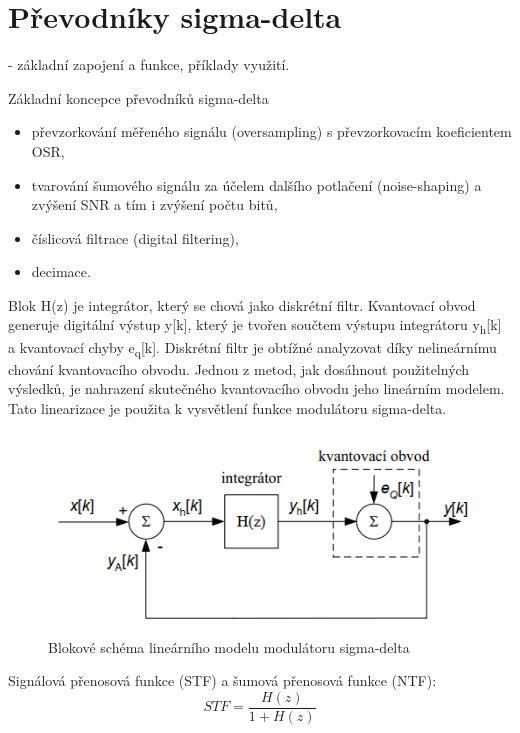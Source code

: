 \section{Převodníky sigma-delta}
- základní zapojení a funkce, příklady využití.

Základní koncepce převodníků sigma-delta
\begin{itemize}
\item převzorkování měřeného signálu (oversampling) s převzorkovacím koeficientem OSR,
\item tvarování šumového signálu za účelem dalšího potlačení (noise-shaping) a zvýšení SNR a tím i zvýšení počtu bitů,
\item číslicová filtrace (digital filtering),
\item decimace.
\end{itemize}

Blok H(z) je integrátor, který se chová jako diskrétní filtr. Kvantovací obvod generuje digitální výstup y[k], který je tvořen součtem výstupu integrátoru y\textsubscript{h}[k] a kvantovací chyby e\textsubscript{q}[k]. Diskrétní filtr je obtížné analyzovat díky nelineárnímu chování kvantovacího obvodu. Jednou z metod, jak dosáhnout použitelných výsledků, je
nahrazení skutečného kvantovacího obvodu jeho lineárním modelem. Tato linearizace je použita k vysvětlení funkce modulátoru sigma-delta. 
\begin{figure}[h]
   \begin{center}
     \includegraphics[scale=0.6]{images/sigma.png}
   \end{center}
   \caption{Blokové schéma lineárního modelu modulátoru sigma-delta}
\end{figure}

Signálová přenosová funkce (STF) a šumová přenosová funkce (NTF):
\begin{equation}
STF = \frac{H(z)}{1+H(z)}
\end{equation}

